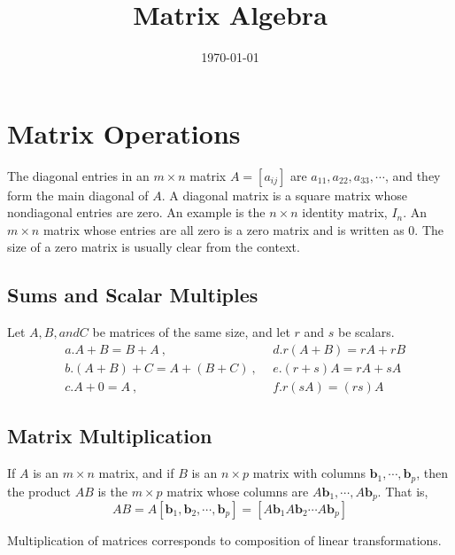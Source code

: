 \documentclass[12pt,a4paper]{article}
\title{Matrix Algebra}
\author{}
\date{\today}
\renewcommand{\vec}[1]{\boldsymbol{#1}}
\begin{document}
\maketitle
\section{Matrix Operations}

The diagonal entries in an $m\times n$ matrix $A= [a_{ij}]$ are $a_{11}, a_{22}, a_{33}, \cdots$, and they form the main diagonal of $A$. A diagonal matrix is a square matrix whose nondiagonal entries are zero. An example is the $n\times n$ identity matrix, $I_n$. An $m\times n$ matrix whose entries are all zero is a zero matrix and is written as $0$. The size of a zero matrix is usually clear from the context.

\subsection{Sums and Scalar Multiples}

\begin{tcolorbox}[colback=green!5,colframe=green!40!black,title= Theorem]
Let $A, B, and C$ be matrices of the same size, and let $r$ and $s$ be scalars. 
\begin{align}
& a. A+B = B+A ~, ~~ & d. r(A+B) = rA +rB \\
& b. (A+B) +C =A +(B +C) ~, ~~ & e. (r +s)A = rA +sA \\
& c. A+0 = A ~, ~~ & f. r(sA)=(rs)A
\end{align}
\end{tcolorbox}

\subsection{Matrix Multiplication}

\begin{tcolorbox}[colback=green!5,colframe=green!40!black,title= Theorem]
If $A$ is an $m\times n$ matrix, and if $B$ is an $n\times p$ matrix with columns $\vec{b}_1, \cdots, \vec{b}_p$, then the product $AB$ is the $m\times p$ matrix whose columns are $A\vec{b}_1, \cdots, A\vec{b}_p$. That is, 
\begin{equation*}
AB = A [\vec{b}_1, \vec{b}_2, \cdots, \vec{b}_p] = [A\vec{b}_1 A\vec{b}_2 \cdots A\vec{b}_p]
\end{equation*}
\end{tcolorbox}

Multiplication of matrices corresponds to composition of linear transformations.
\end{document}
